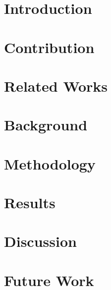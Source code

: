 \documentclass[acmtog, screen, balance]{acmart}
\begin{document}
\maketitle


\section{Introduction} \label{introduction}



\section{Contribution}


\section{Related Works}


\section{Background}


\section{Methodology}


\section{Results}


\section{Discussion}


\section{Future Work}

\end{document}
